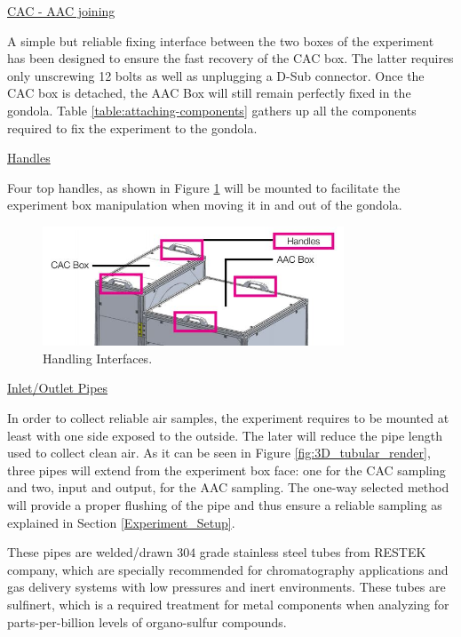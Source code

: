 \documentclass[a4paper,12pt,twoside]{article}
\begin{document}
\bigskip
\underline{CAC - AAC joining}

\smallskip
A simple but reliable fixing interface between the two boxes of the experiment has been designed to ensure the fast recovery of the CAC box. The latter requires only unscrewing 12 bolts as well as unplugging a D-Sub connector. Once the CAC box is detached, the AAC Box will still remain perfectly fixed in the gondola. Table \ref{table:attaching-components} gathers up all the components required to fix the experiment to the gondola.

\bigskip
\underline{Handles}

\smallskip
Four top handles, as shown in Figure \ref{fig:handles} will be mounted to facilitate the experiment box manipulation when moving it in and out of the gondola.

\begin{figure}[H]
    \centering
    \includegraphics[width=0.8\textwidth]{4-experiment-design/img/Mechanical/handles.jpg}
    \caption{Handling Interfaces.}
    \label{fig:handles}
\end{figure}

\bigskip
\underline{Inlet/Outlet Pipes}
\label{subsec:pipes}

\smallskip
In order to collect reliable air samples, the experiment requires to be mounted at least with one side exposed to the outside. The later will reduce the pipe length used to collect clean air. As it can be seen in Figure \ref{fig:3D_tubular_render}, three pipes will extend from the experiment box face: one for the CAC sampling and two, input and output, for the AAC sampling. The one-way selected method will provide a proper flushing of the pipe and thus ensure a reliable sampling as explained in Section \ref{Experiment_Setup}.

These pipes are welded/drawn $304$ grade stainless steel tubes from RESTEK company, which are specially recommended for chromatography applications and gas delivery systems with low pressures and inert environments. These tubes are sulfinert, which is a required treatment for metal components when analyzing for parts-per-billion levels of organo-sulfur compounds.
\end{document}
